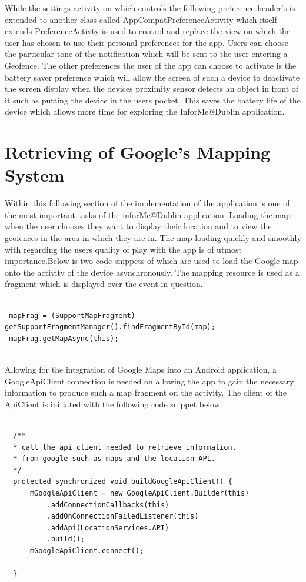 While the settings activity on which controls the following preference header's is extended to another class called AppCompatPreferenceActivity which itself extends PreferenceActivty is used to control and replace the view on which the user has chosen to use their personal preferences for the app. Users can choose the particular tone of the notification which will be sent to the user entering a Geofence. The other preferences the user of the app can choose to activate is the battery saver preference which will allow the screen of such a device to deactivate the screen display when the devices proximity sensor detects an object in front of it such as putting the device in the users pocket. This saves the battery life of the device which allows more time for exploring the InforMe@Dublin application.

\section{Retrieving of Google's Mapping System}
Within this following section of the implementation of the application is one of the most important tasks of the inforMe@Dublin application. Loading the map when the user chooses they want to display their location and to view the geofences in the area in which they are in. The map loading quickly and smoothly with regarding the users quality of play with the app is of utmost importance.Below is two code snippets of which are used to load the Google map onto the activity of the device asynchronously. The mapping resource is used as a fragment which is displayed over the event in question.
\begin{lstlisting}[style=myCustomMatlabStyle, basicstyle=\small, breaklines, caption=OnCreate Method Map Loading Example,captionpos=b] 

 mapFrag = (SupportMapFragment) getSupportFragmentManager().findFragmentById(map);
 mapFrag.getMapAsync(this);
 
\end{lstlisting}
Allowing for the integration of Google Maps into an Android application, a GoogleApiClient connection is needed on allowing the app to gain the necessary information to produce such a map fragment on the activity. The client of the ApiClient is initiated with the following code snippet below.
\begin{lstlisting}[style=myCustomMatlabStyle, basicstyle=\small, breaklines, caption=buildGoogleApiClient Code Snippet,captionpos=b] 

  /**
  * call the api client needed to retrieve information.
  * from google such as maps and the location API.
  */
  protected synchronized void buildGoogleApiClient() {
      mGoogleApiClient = new GoogleApiClient.Builder(this)
          .addConnectionCallbacks(this)
          .addOnConnectionFailedListener(this)
          .addApi(LocationServices.API)
          .build();
      mGoogleApiClient.connect();
  
  }

\end{lstlisting}
